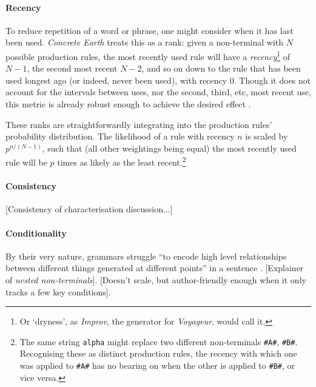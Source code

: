 \documentclass[a4paper, 11pt]{article}
\begin{document}
\begin{flushleft}
\paragraph{Recency} To reduce repetition of a word or phrase, one might consider when it has last been used. \textit{Concrete Earth} treats this as a rank: given a non-terminal with $N$ possible production rules, the most recently used rule will have a \textit{recency}\footnote{Or `dryness', as \textit{Improv}, the generator for \textit{Voyageur}, would call it.} of $N-1$, the second most recent $N-2$, and so on down to the rule that has been used longest ago (or indeed, never been used), with recency $0$. Though it does not account for the intervals between uses, nor the second, third, etc, most recent use, this metric is already robust enough to achieve the desired effect \citep{kazemiSimpleProceduralGeneration}.

\vspace{5pt}\noindent
These ranks are straightforwardly integrating into the production rules' probability distribution. The likelihood of a rule with recency $n$ is scaled by $p^{n/(N-1)}$, such that (all other weightings being equal) the most recently used rule will be $p$ times as likely as the least recent.\footnote{The same string \texttt{alpha} might replace two different non-terminals \texttt{\#A\#}, \texttt{\#B\#}. Recognising these as distinct production rules, the recency with which one was applied to \texttt{\#A\#} has no bearing on when the other is applied to \texttt{\#B\#}, or vice versa.} 


\paragraph{Consistency} [Consistency of characterisation discussion...]

\vspace{5pt}

\paragraph{Conditionality} By their very nature, grammars struggle ``to encode high level relationships between different things generated at different points'' in a sentence \citep{cmptn19}. [Explainer of \textit{nested non-terminals}]. [Doesn't scale, but author-friendly enough when it only tracks a few key conditions].


\end{flushleft}
\end{document}
